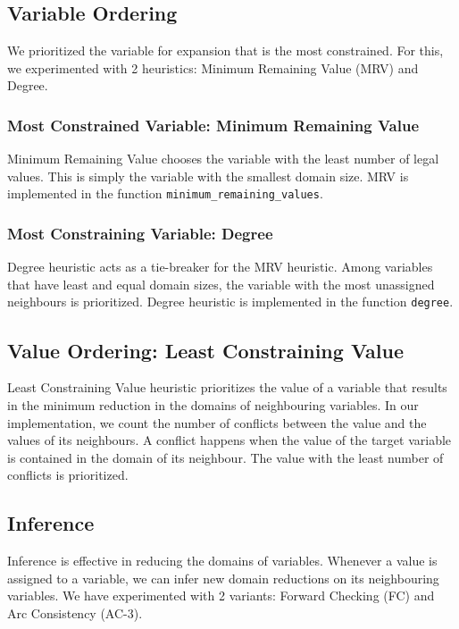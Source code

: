 \documentclass[runningheads]{llncs}
\begin{document}
\subsection{Variable Ordering}
We prioritized the variable for expansion that is the most constrained. For this, we experimented with 2 heuristics: Minimum Remaining Value (MRV) and Degree.

\subsubsection{Most Constrained Variable: Minimum Remaining Value}

Minimum Remaining Value chooses the variable with the least number of legal values. This is simply the variable with the smallest domain size. MRV is implemented in the function \verb`minimum_remaining_values`.

\subsubsection{Most Constraining Variable: Degree}
Degree heuristic acts as a tie-breaker for the MRV heuristic. Among variables that have least and equal domain sizes, the variable with the most unassigned neighbours is prioritized. Degree heuristic is implemented in the function \verb`degree`. 

\subsection{Value Ordering: Least Constraining Value}

Least Constraining Value heuristic prioritizes the value of a variable that results in the minimum reduction in the domains of neighbouring variables. In our implementation, we count the number of conflicts between the value and the values of its neighbours. A conflict happens when the value of the target variable is contained in the domain of its neighbour. The value with the least number of conflicts is prioritized. 


\subsection{Inference}

Inference is effective in reducing the domains of variables. Whenever a value is assigned to a variable, we can infer new domain reductions on its neighbouring variables. We have experimented with 2 variants: Forward Checking (FC) and Arc Consistency (AC-3). 
\end{document}
